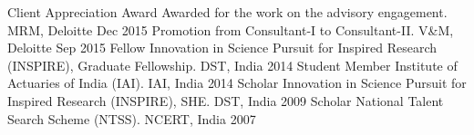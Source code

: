 		\begin{cvhonors}
			\cvhonor
				{Client Appreciation Award}
				{Awarded for the work on the advisory engagement.}
				{MRM, Deloitte}
				{Dec 2015}
			\cvhonor
				{Promotion}
				{from Consultant-I to Consultant-II.}
				{V\&M, Deloitte}
				{Sep 2015}
  \cvhonor
    {Fellow}
    {Innovation in Science Pursuit for Inspired Research (INSPIRE), Graduate Fellowship.}
    {DST, India}
    {2014}
  \cvhonor
	{Student Member}
	{Institute of Actuaries of India (IAI).}
	{IAI, India}
	{2014}
  \cvhonor
    {Scholar}
    {Innovation in Science Pursuit for Inspired Research (INSPIRE), SHE.}
    {DST, India}
    {2009}
  \cvhonor
    {Scholar}
    {National Talent Search Scheme (NTSS).}
    {NCERT, India}
    {2007}
 \end{cvhonors}
